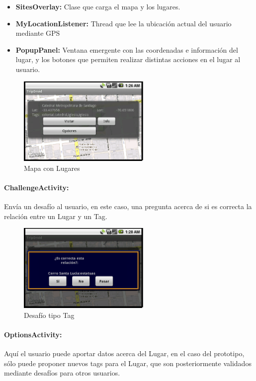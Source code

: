 \documentclass[10pt,letterpaper]{article}
\begin{document}
\begin{itemize}
 \item \textbf{SitesOverlay:} Clase que carga el mapa y los lugares.
 \item \textbf{MyLocationListener:} Thread que lee la ubicación actual del usuario mediante GPS
 \item \textbf{PopupPanel:} Ventana emergente con las coordenadas e información del lugar, y los botones que permiten realizar distintas acciones en el lugar al usuario.
\end{itemize}

\begin{figure}[h]
\begin{center}
\includegraphics[width=180pt]{./imgs/TripdroidMapaMenu.png}
\caption{Mapa con Lugares}
\end{center}
\end{figure}

\newpage
\paragraph{ChallengeActivity:} Envía un desafío al usuario, en este caso, una pregunta acerca de si es correcta la relación entre un Lugar y un Tag.

\begin{figure}[h]
\begin{center}
\includegraphics[width=180pt]{./imgs/TripdroidDesafio.png}
\caption{Desafío tipo Tag}
\end{center}
\end{figure}

\paragraph{OptionsActivity:} Aquí el usuario puede aportar datos acerca del Lugar, en el caso del prototipo, sólo puede proponer nuevos tags para el Lugar, que son posteriormente validados mediante desafíos para otros usuarios.
\end{document}
